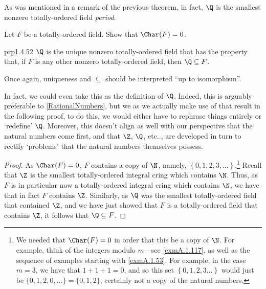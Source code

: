 As was mentioned in a remark of the previous theorem, in fact, $\Q$ is the smallest nonzero totally-ordered field \emph{period}.
\begin{exr}{}{}
Let $F$ be a totally-ordered field.  Show that $\Char (F)=0$.
\end{exr}
\begin{thm}{}{prp1.4.52}
$\Q$ is the unique nonzero totally-ordered field that has the property that, if $F$ is any other nonzero totally-ordered field, then $\Q \subseteq F$.
\begin{rmk}
Once again, uniqueness and $\subseteq$ should be interpreted ``up to isomorphism''.
\end{rmk}
\begin{rmk}
In fact, we could even take this as the definition of $\Q$.  Indeed, this is arguably preferable to \cref{RationalNumbers}, but we as we actually make use of that result in the following proof, to do this, we would either have to rephrase things entirely or `redefine' $\Q$.  Moreover, this doesn't align as well with our perspective that the natural numbers come first, and that $\Z$, $\Q$, etc.., are developed in turn to rectify `problems' that the natural numbers themselves possess.
\end{rmk}
\begin{proof}
As $\Char (F)=0$, $F$ contains a copy of $\N$, namely, $\left\{ 0,1,2,3,\ldots \right\}$.\footnote{We needed that $\Char (F)=0$ in order that this be a copy of $\N$.  For example, think of the integers modulo $m$---see \cref{exmA.1.117}, as well as the sequence of examples starting with \cref{exmA.1.53}.  For example, in the case $m=3$, we have that $1+1+1=0$, and so this set $\left\{ 0,1,2,3\ldots \right\}$ would just be $\{ 0,1,2,0,\ldots \} =\{ 0,1,2\}$, certainly not a copy of the natural numbers.}  Recall that $\Z$ is the smallest totally-ordered integral cring which contains $\N$.  Thus, as $F$ is in particular now a totally-ordered integral cring which contains $\N$, we have that in fact $F$ contains $\Z$.  Similarly, as $\Q$ was the smallest totally-ordered field that contained $\Z$, and we have just showed that $F$ is a totally-ordered field that contains $\Z$, it follows that $\Q \subseteq F$.
\end{proof}
\end{thm}

